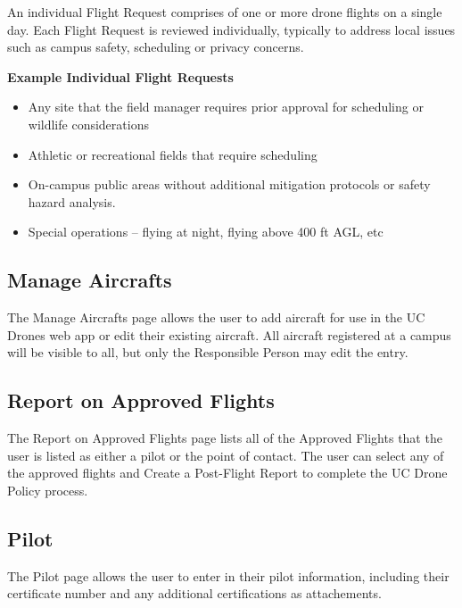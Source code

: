 \documentclass[
  12pt,
]{book}
\providecommand{\tightlist}{%
  \setlength{\itemsep}{0pt}\setlength{\parskip}{0pt}}
\begin{document}
An individual Flight Request comprises of one or more drone flights on a single day. Each Flight Request is reviewed individually, typically to address local issues such as campus safety, scheduling or privacy concerns.

\textbf{Example Individual Flight Requests}

\begin{itemize}
\tightlist
\item
  Any site that the field manager requires prior approval for scheduling or wildlife considerations
\item
  Athletic or recreational fields that require scheduling
\item
  On-campus public areas without additional mitigation protocols or safety hazard analysis.
\item
  Special operations -- flying at night, flying above 400 ft AGL, etc
\end{itemize}

\hypertarget{manage-aircrafts}{%
\subsection{Manage Aircrafts}\label{manage-aircrafts}}

The Manage Aircrafts page allows the user to add aircraft for use in the UC Drones web app or edit their existing aircraft. All aircraft registered at a campus will be visible to all, but only the Responsible Person may edit the entry.

\hypertarget{report-on-approved-flights}{%
\subsection{Report on Approved Flights}\label{report-on-approved-flights}}

The Report on Approved Flights page lists all of the Approved Flights that the user is listed as either a pilot or the point of contact. The user can select any of the approved flights and Create a Post-Flight Report to complete the UC Drone Policy process.

\hypertarget{pilot}{%
\subsection{Pilot}\label{pilot}}

The Pilot page allows the user to enter in their pilot information, including their certificate number and any additional certifications as attachements.
\end{document}
